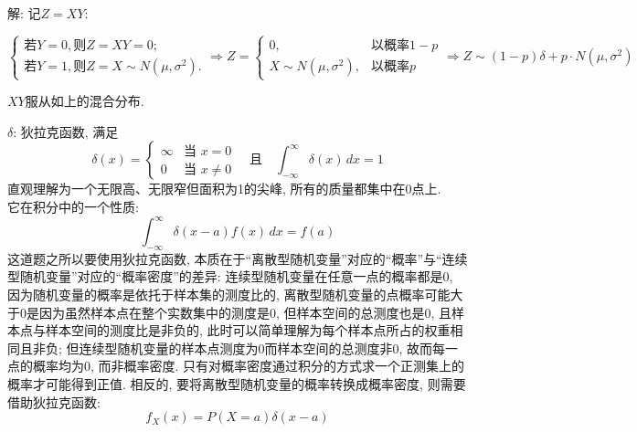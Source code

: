 \documentclass[standard]{ExBook}
\begin{document}
\begin{qitems}
\vspace{-5em}

    \begin{bbox}
解: 
记$Z=XY$:
\vspace{-2em}
\begin{center}
\begin{equation}
    \left\{
    \begin{array}{l}
        \nonumber
        \text{若}Y=0, \text{则}Z=XY=0;\\
        \text{若}Y=1, \text{则}Z=X\sim N(\mu,\sigma^2).
    \end{array}
    \right.
    \Longrightarrow
    Z=
    \left\{
    \begin{array}{cl}
        \nonumber
        0, & \text{以概率}1-p\\
        X\sim N(\mu,\sigma^2), & \text{以概率}p
    \end{array}
    \right.
    \Longrightarrow
    Z\sim (1-p)\delta+p\cdot N(\mu,\sigma^2)
\end{equation}
\end{center}
$XY$服从如上的混合分布.
    \end{bbox}

\vspace{-5em}

    \begin{bbox}
\textcolor{themeColor}{\selectfont {} $\delta$: 狄拉克函数, 满足\[
\delta(x) =
\begin{cases}
\infty & \text{当 } x = 0 \\
0 & \text{当 } x \neq 0
\end{cases}
\quad \text{且} \quad \int_{-\infty}^{\infty} \delta(x) \, dx = 1
\]
直观理解为一个无限高、无限窄但面积为1的尖峰, 所有的质量都集中在0点上.\\
它在积分中的一个性质:
\[
\int_{-\infty}^{\infty} \delta(x - a) f(x) \, dx = f(a)
\]
这道题之所以要使用狄拉克函数, 本质在于``离散型随机变量''对应的``概率''与``连续型随机变量''对应的``概率密度''的差异: 连续型随机变量在任意一点的概率都是0, 因为随机变量的概率是依托于样本集的测度比的, 离散型随机变量的点概率可能大于0是因为虽然样本点在整个实数集中的测度是0, 但样本空间的总测度也是0, 且样本点与样本空间的测度比是非负的, 此时可以简单理解为每个样本点所占的权重相同且非负; 但连续型随机变量的样本点测度为0而样本空间的总测度非0, 故而每一点的概率均为0, 而非概率密度. 只有对概率密度通过积分的方式求一个正测集上的概率才可能得到正值. 相反的, 要将离散型随机变量的概率转换成概率密度, 则需要借助狄拉克函数: 
$$f_{X}(x)=P(X=a)\delta(x-a)$$}


\end{bbox}
\end{qitems}
\end{document}
